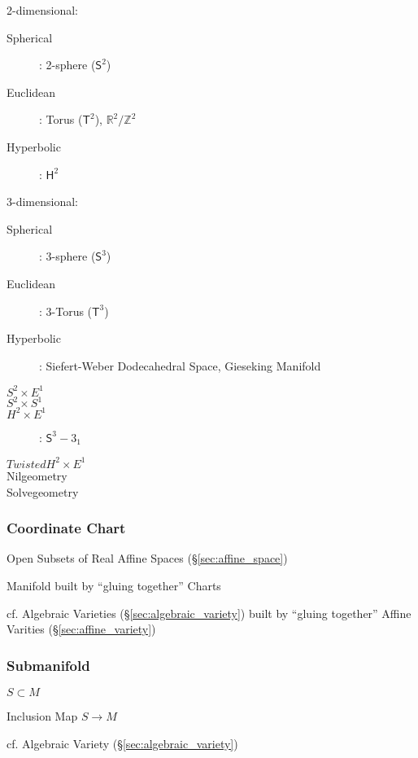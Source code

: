 2-dimensional:

\begin{description}
  \item [Spherical]: 2-sphere ($\mathsf{S}^2$)
  \item [Euclidean]: Torus ($\mathsf{T}^2$),
  $\mathbb{R}^2/\mathbb{Z}^2$
  \item [Hyperbolic]: $\mathsf{H}^2$
\end{description}

3-dimensional:

\begin{description}
  \item [Spherical]: 3-sphere ($\mathsf{S}^3$)
  \item [Euclidean]: 3-Torus ($\mathsf{T}^3$)
  \item [Hyperbolic]: Siefert-Weber Dodecahedral Space, Gieseking
  Manifold
  \item [$S^2 \times E^1$]
  \item [$S^2 \times S^1$]
  \item [$H^2 \times E^1$]: $\mathsf{S}^3 - 3_1$
  \item [$Twisted H^2 \times E^1$]
  \item [Nilgeometry]
  \item [Solvegeometry]
\end{description}



\subsubsection{Coordinate Chart}\label{sec:coordinate_chart}

Open Subsets of Real Affine Spaces (\S\ref{sec:affine_space})

Manifold built by ``gluing together'' Charts

cf. Algebraic Varieties (\S\ref{sec:algebraic_variety}) built by ``gluing
together'' Affine Varities (\S\ref{sec:affine_variety})



\subsubsection{Submanifold}\label{sec:submanifold}

$S \subset M$

Inclusion Map $S \rightarrow M$

cf. Algebraic Variety (\S\ref{sec:algebraic_variety})



